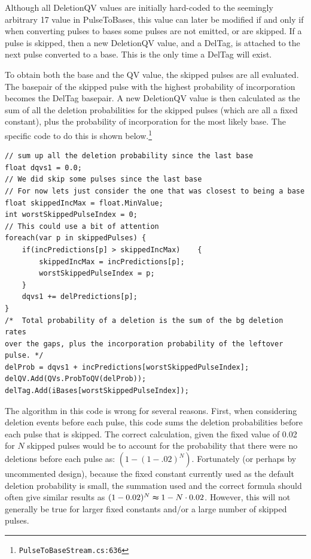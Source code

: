 \documentclass[fleqn,10pt]{SelfArx} %
\begin{document}
Although all DeletionQV values are initially hard-coded to the seemingly arbitrary 17 value in PulseToBases, this value can later be modified if and only if when converting pulses to bases some pulses are not emitted, or are skipped.  If a pulse is skipped, then a new DeletionQV value, and a DelTag, is attached to the next pulse converted to a base.  This is the only time a DelTag will exist.

To obtain both the base and the QV value, the skipped pulses are all evaluated.  The basepair of the skipped pulse with the highest probability of incorporation becomes the DelTag basepair.  A new DeletionQV value is then calculated as the sum of all the deletion probabilities for the skipped pulses (which are all a fixed constant), plus the probability of incorporation for the most likely base.  The specific code to do this is shown below.\footnote{\texttt{PulseToBaseStream.cs:636}}

\lstset{style=sharpc}
\begin{lstlisting}[frame=single]
// sum up all the deletion probability since the last base
float dqvs1 = 0.0;
// We did skip some pulses since the last base
// For now lets just consider the one that was closest to being a base
float skippedIncMax = float.MinValue;
int worstSkippedPulseIndex = 0;
// This could use a bit of attention
foreach(var p in skippedPulses) {
    if(incPredictions[p] > skippedIncMax)    {
        skippedIncMax = incPredictions[p];
        worstSkippedPulseIndex = p;
    }
    dqvs1 += delPredictions[p];
}
/*  Total probability of a deletion is the sum of the bg deletion rates 
over the gaps, plus the incorporation probability of the leftover 
pulse. */
delProb = dqvs1 + incPredictions[worstSkippedPulseIndex];
delQV.Add(QVs.ProbToQV(delProb));
delTag.Add(iBases[worstSkippedPulseIndex]);
\end{lstlisting}

The algorithm in this code is wrong for several reasons.  First, when considering deletion events before each pulse, this code sums the deletion probabilities before each pulse that is skipped. The correct calculation, given the fixed value of 0.02 for $N$ skipped pulses would be to account for the probability that there were no deletions before each pulse as: $ (1 - (1-.02)^N)$.  Fortunately (or perhaps by uncommented design), because the fixed constant currently used as the default deletion probability is small, the summation used and the correct formula should often give similar results as $(1-0.02)^N \thickapprox 1 - N\cdot0.02$.  However, this will not generally be true for larger fixed constants and/or a large number of skipped pulses.
\end{document}
